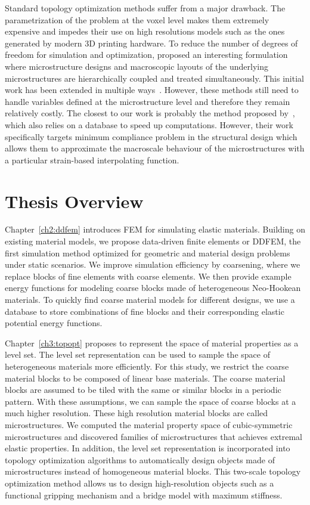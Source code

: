 Standard topology optimization methods suffer from a major drawback.
The parametrization of the problem at the voxel level makes them extremely expensive and impedes their use on high resolutions models such as the ones generated by modern 3D printing hardware.
To reduce the number of degrees of freedom for simulation and optimization, \citet{rodrigues:2002:h} proposed an interesting formulation where microstructure designs 
and macroscopic layouts of the underlying microstructures are hierarchically coupled and treated simultaneously.
This initial work has been extended in multiple ways~\citep{coelho:2008:h,nakshatrala:2013:non,yan:2014:concurrent,xia:2014:reduced}.
However, these methods still need to handle variables defined at
the microstructure level and therefore they remain relatively costly.
The closest to our work is probably the method proposed by~\citet{xia:2015:multiscale},
which also relies on a database to speed up computations.
However, their work specifically targets minimum compliance problem in the structural design which allows them to approximate the macroscale behaviour of the microstructures with a
particular strain-based interpolating function.
\section{Thesis Overview}\label{ch1:desc}
Chapter~\ref{ch2:ddfem} introduces FEM for simulating elastic materials.
Building on existing material models, we propose data-driven finite elements or DDFEM,
the first simulation method optimized for geometric and material design problems under static scenarios.
We improve simulation efficiency by coarsening, where we replace blocks of fine elements with coarse elements.
We then provide example energy functions for modeling coarse blocks made of heterogeneous Neo-Hookean materials.
To quickly find coarse material models for different designs, 
we use a database to store combinations of fine blocks and their corresponding elastic potential energy functions.

Chapter~\ref{ch3:topopt} proposes to represent the space of material properties as a level set.
The level set representation can be used to sample the space of heterogeneous materials more efficiently.
For this study, we restrict the coarse material blocks to be composed of linear base materials.
The coarse material blocks are assumed to be tiled with the same or similar blocks in a periodic pattern.
With these assumptions, we can sample the space of coarse blocks at a much higher resolution.
These high resolution material blocks are called microstructures.
We computed the material property space of cubic-symmetric microstructures and discovered families of microstructures that achieves extremal elastic properties.
In addition, the level set representation is incorporated into topology optimization algorithms to automatically design objects made of microstructures instead of homogeneous material blocks.
This two-scale topology optimization method allows us to design high-resolution objects such as a functional gripping mechanism and a bridge model with maximum stiffness.

